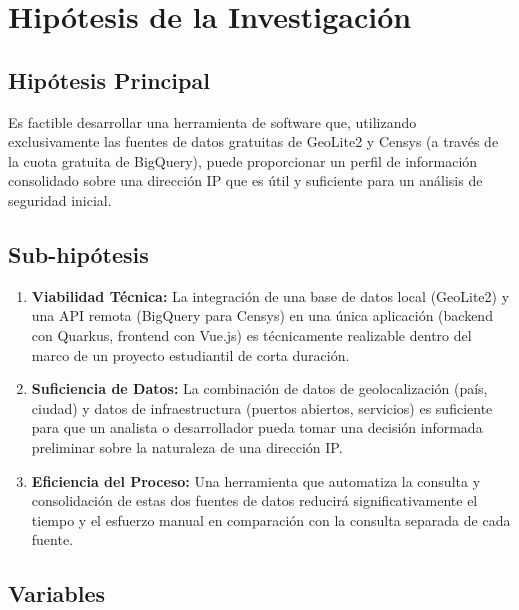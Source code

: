 \section{Hipótesis de la Investigación}

\subsection{Hipótesis Principal}

Es factible desarrollar una herramienta de software que, utilizando exclusivamente las fuentes de datos gratuitas de GeoLite2 y Censys (a través de la cuota gratuita de BigQuery), puede proporcionar un perfil de información consolidado sobre una dirección IP que es útil y suficiente para un análisis de seguridad inicial.

\subsection{Sub-hipótesis}

\begin{enumerate}
    \item \textbf{Viabilidad Técnica:} La integración de una base de datos local (GeoLite2) y una API remota (BigQuery para Censys) en una única aplicación (backend con Quarkus, frontend con Vue.js) es técnicamente realizable dentro del marco de un proyecto estudiantil de corta duración.
    
    \item \textbf{Suficiencia de Datos:} La combinación de datos de geolocalización (país, ciudad) y datos de infraestructura (puertos abiertos, servicios) es suficiente para que un analista o desarrollador pueda tomar una decisión informada preliminar sobre la naturaleza de una dirección IP.
    
    \item \textbf{Eficiencia del Proceso:} Una herramienta que automatiza la consulta y consolidación de estas dos fuentes de datos reducirá significativamente el tiempo y el esfuerzo manual en comparación con la consulta separada de cada fuente.
\end{enumerate}

\subsection{Variables}

